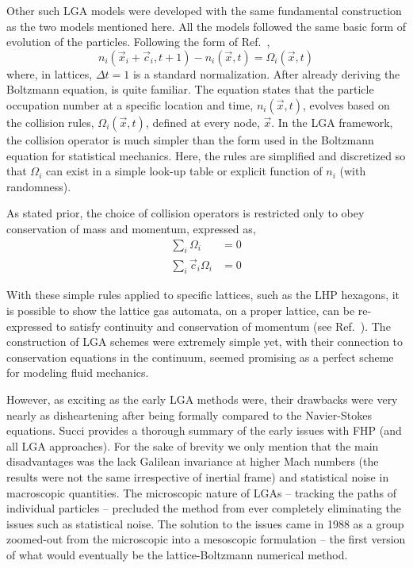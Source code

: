 Other such LGA models were developed with the same fundamental construction as the two models mentioned here. All the models followed the same basic form of evolution of the particles. Following the form of Ref.~\cite{chopard1998cellular},
\begin{equation}\label{eq:lattice-evolution}
	n_i(\vec{x}_i + \vec{c}_i,t+1) - n_i(\vec{x},t) = \Omega_i(\vec{x},t)
\end{equation}
where, in lattices, $\Delta t = 1$ is a standard normalization. After already deriving the Boltzmann equation,  is quite familiar. The equation states that the particle occupation number at a specific location and time, $n_i(\vec{x},t)$, evolves based on the collision rules, $\Omega_i(\vec{x},t)$, defined at every node, $\vec{x}$. In the LGA framework, the collision operator is much simpler than the form used in the Boltzmann equation for statistical mechanics. Here, the rules are simplified and discretized so that $\Omega_i$ can exist in a simple look-up table or explicit function of $n_i$ (with randomness).\cite{chopard1998cellular,Sukop2007}

As stated prior, the choice of collision operators is restricted only to obey conservation of mass and momentum, expressed as,
\begin{subequations}
\begin{align}
	\sum_i\Omega_i &= 0\\
	\sum_i\vec{c}_i\Omega_i&=0
\end{align}
\end{subequations}

With these simple rules applied to specific lattices, such as the LHP hexagons, it is possible to show the lattice gas automata, on a proper lattice, can be re-expressed to satisfy continuity and conservation of momentum (see Ref.~\cite{Viggen2009,Frisch1986}). The construction of LGA schemes were extremely simple yet, with their connection to conservation equations in the continuum, seemed promising as a perfect scheme for modeling fluid mechanics.

However, as exciting as the early LGA methods were, their drawbacks were very nearly as disheartening after being formally compared to the Navier-Stokes equations. Succi provides a thorough summary of the early issues with FHP (and all LGA approaches).\cite{succi2001lattice} For the sake of brevity we only mention that the main disadvantages was the lack Galilean invariance at higher Mach numbers (the results were not the same irrespective of inertial frame) and statistical noise in macroscopic quantities. The microscopic nature of LGAs -- tracking the paths of individual particles -- precluded the method from ever completely eliminating the issues such as statistical noise. The solution to the issues came in 1988 as a group zoomed-out from the microscopic into a mesoscopic formulation -- the first version of what would eventually be the lattice-Boltzmann numerical method.



